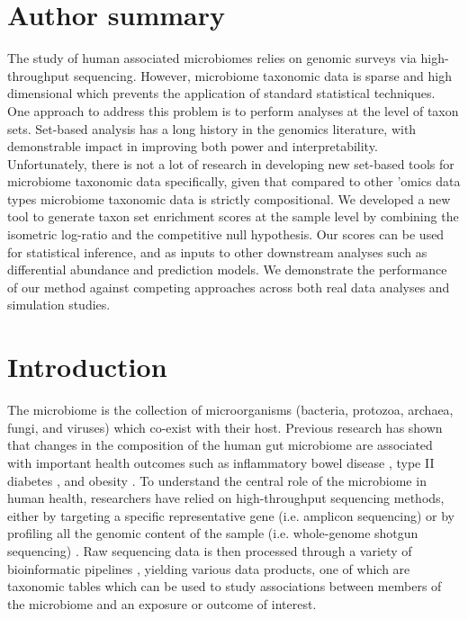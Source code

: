 \documentclass[10pt,letterpaper]{article}
\begin{document}
\section*{Author summary}
The study of human associated microbiomes relies on genomic surveys via high-throughput sequencing. However, microbiome taxonomic data is sparse and high dimensional which prevents the application of standard statistical techniques. One approach to address this problem is to perform analyses at the level of taxon sets. Set-based analysis has a long history in the genomics literature, with demonstrable impact in improving both power and interpretability. Unfortunately, there is not a lot of research in developing new set-based tools for microbiome taxonomic data specifically, given that compared to other 'omics data types microbiome taxonomic data is strictly compositional. We developed a new tool to generate taxon set enrichment scores at the sample level by combining the isometric log-ratio and the competitive null hypothesis. Our scores can be used for statistical inference, and as inputs to other downstream analyses such as differential abundance and prediction models. We demonstrate the performance of our method against competing approaches across both real data analyses and simulation studies. 

\linenumbers

\section*{Introduction}
The microbiome is the collection of microorganisms (bacteria, protozoa, archaea, fungi, and viruses) which co-exist with their host. Previous research has shown that changes in the composition of the human gut microbiome are associated with important health outcomes such as inflammatory bowel disease \cite{proctor2019}, type II diabetes \cite{sharma2019}, and obesity \cite{aoun2020}. To understand the central role of the microbiome in human health, researchers have relied on high-throughput sequencing methods, either by targeting a specific representative gene (i.e. amplicon sequencing) or by profiling all the genomic content of the sample (i.e. whole-genome shotgun sequencing) \cite{cho2012}. Raw sequencing data is then processed through a variety of bioinformatic pipelines \cite{callahan2016, truong2015}, yielding various data products, one of which are taxonomic tables which can be used to study associations between members of the microbiome and an exposure or outcome of interest. 
\end{document}
